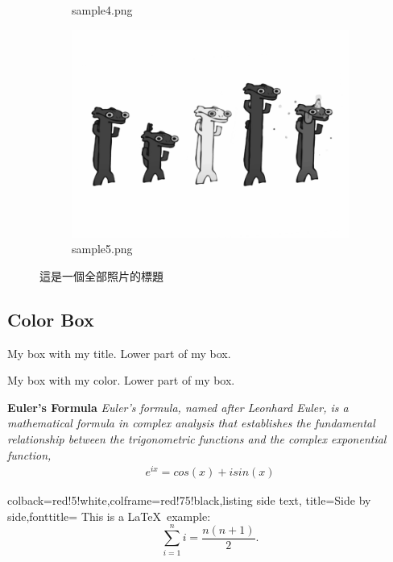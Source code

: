 \begin{figure}[H]
\begin{subfigure}[t]{.3\textwidth}
    \caption*{sample4.png}
    \end{subfigure}
    \begin{subfigure}[t]{.3\textwidth}
    \centering
    \includegraphics[width=0.9\linewidth]{images/samples/sample5.png}
    \caption*{sample5.png}
    \end{subfigure}
    \caption{這是一個全部照片的標題}
\end{figure}

\newpage
\subsection{Color Box}

\begin{tcolorbox}[title=My title]
  My box with my title.
  \tcblower
  Lower part of my box.
\end{tcolorbox}

\begin{tcolorbox}[colback=blue!5!white,colframe=blue!75!black,title=My title]
  My box with my color.
  \tcblower
  Lower part of my box.
\end{tcolorbox}

\begin{tcolorbox}
\textbf{
    Euler's Formula
} 
\textit{
    Euler's formula, named after Leonhard Euler, is a mathematical formula in complex analysis that establishes the fundamental relationship between the trigonometric functions and the complex exponential function,
}
\begin{align*}
    e^{ix} = cos(x) + i sin(x)
\end{align*}
\end{tcolorbox}

\begin{tcblisting}{colback=red!5!white,colframe=red!75!black,listing side text,
  title=Side by side,fonttitle=\bfseries}
This is a \LaTeX\ example:
\begin{equation}
\sum\limits_{i=1}^n i = \frac{n(n+1)}{2}.
\end{equation}
\end{tcblisting}

\newpage